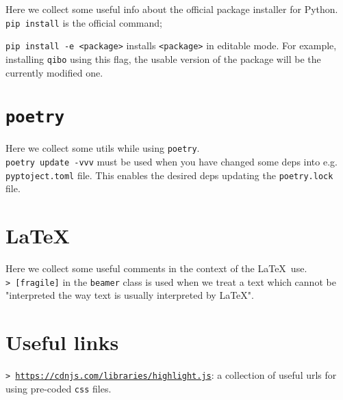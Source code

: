 \documentclass[11pt]{article}
\newcommand{\cmd}[1]{\colorbox{light-gray}{\textcolor{gio}{\texttt{#1}}}}
\begin{document}
\begin{multicols}{2}
Here we collect some useful info about the official  package installer for Python. \\

\cmd{pip install} is the official command;

\cmd{pip install -e <package>} installs \texttt{<package>} in editable mode. For example, installing \texttt{qibo} using this flag, the usable version of the package will be the currently modified one.

\section{\texttt{poetry}}

Here we collect some utils while using \texttt{poetry}. \\

\cmd{poetry update -vvv} must be used when you have changed some deps into e.g. \texttt{pyptoject.toml} file. This enables the desired deps updating the \texttt{poetry.lock} file.

\section{\LaTeX}

Here we collect some useful comments in the context of the \LaTeX$\,$ use. \\

\cmd{> [fragile]} in the \texttt{beamer} class is used when we treat a text which cannot be "interpreted the way text is usually interpreted by \LaTeX".


\newpage

\section*{Useful links}

\cmd{> \href{https://cdnjs.com/libraries/highlight.js}{https://cdnjs.com/libraries/highlight.js}}:
 a collection of useful urls for using pre-coded \texttt{css} files.

\newpage
\end{multicols}
\end{document}
